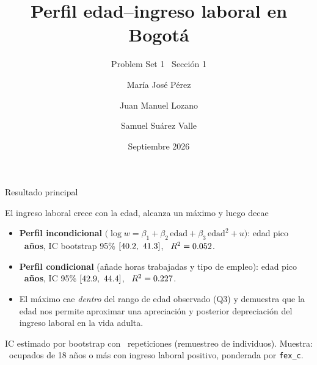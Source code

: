 \documentclass[aspectratio=169]{beamer}
\title[Perfil edad--ingreso]{Perfil edad--ingreso laboral en Bogotá}
\subtitle{Problem Set 1 \textbullet\ Sección 1 }
\author[Perez, Lozano, Suarez]{María José Pérez \and Juan Manuel Lozano \and Samuel Suárez Valle}
\institute[Uniandes]{MECA 4107 --- Big Data y Machine Learning para Economía Aplicada}
\date{Septiembre 2026}
\begin{document}
\begin{frame}[plain]
  \titlepage
\end{frame}

\begin{frame}{Resultado principal}
  \begin{block}{El ingreso laboral crece con la edad, alcanza un máximo y luego decae}
    \begin{itemize}
      \item \textbf{Perfil incondicional}
        $\bigl(\log w = \beta_1 + \beta_2\,\text{edad} + \beta_3\,\text{edad}^2 + u\bigr)$:
        edad pico \textbf{\AgePeakUncond\ años},
        IC bootstrap 95\% $[40.2,\ 41.3]$,
        \ $R^2 = 0.052$.
      \item \textbf{Perfil condicional} (añade horas trabajadas y tipo de empleo):
        edad pico \textbf{\AgePeakCond\ años},
        IC 95\% $[42.9,\ 44.4]$,
        \ $R^2 = 0.227$.
      \item El máximo cae \emph{dentro} del rango de edad observado (Q3) y demuestra que la edad nos permite aproximar una apreciación y posterior depreciación del ingreso laboral en la vida adulta.
    \end{itemize}
  \end{block}
  \vfill
  {\footnotesize IC estimado por bootstrap con \AgeBootReps\ repeticiones (remuestreo de
  individuos). Muestra: \AgeNobs\ ocupados de 18 años o más con ingreso laboral positivo,
  ponderada por \texttt{fex\_c}.}
\end{frame}
\end{document}
